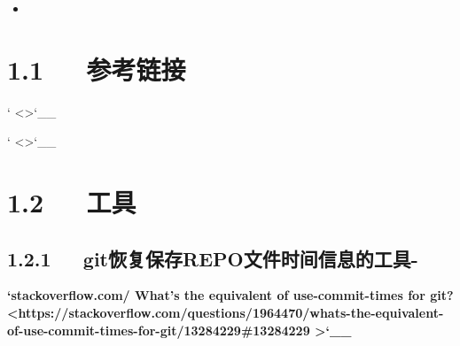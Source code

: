 \documentclass[letterpaper,12pt,english]{sphinxmanual}
\begin{document}
\begin{sphinxShadowBox}
\begin{itemize}
\begin{itemize}
\begin{itemize}
\begin{itemize}
\end{itemize}

\item {} 
\label{\detokenize{001software/001install/001._u7f51_u7ad9/github:id33}}{\hyperref[\detokenize{001software/001install/001._u7f51_u7ad9/github:id7}]{}}

\end{itemize}

\end{itemize}

\end{itemize}
\end{sphinxShadowBox}


\section{1.1   参考链接}
\label{\detokenize{001software/001install/001._u7f51_u7ad9/github:id1}}







{}` \textless{}\textgreater{}{}`\_\_

{}` \textless{}\textgreater{}{}`\_\_


\section{1.2   工具}
\label{\detokenize{001software/001install/001._u7f51_u7ad9/github:id2}}

\subsection{1.2.1   git恢复保存REPO文件时间信息的工具-}
\label{\detokenize{001software/001install/001._u7f51_u7ad9/github:gitrepo}}
{\color{red}\bfseries{}{}`stackoverflow.com/ What's the equivalent of use-commit-times for git? \textless{}https://stackoverflow.com/questions/1964470/whats-the-equivalent-of-use-commit-times-for-git/13284229\#13284229
\textgreater{}{}`\_\_}
\end{document}
